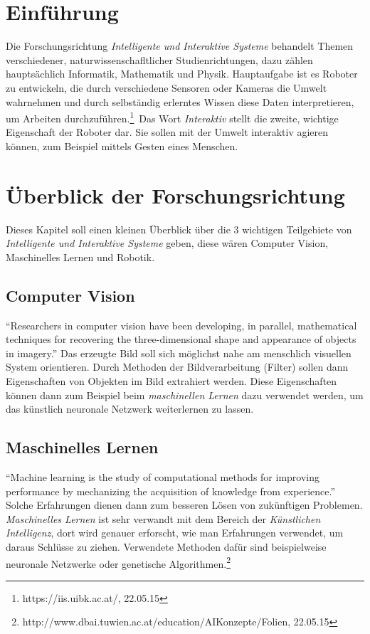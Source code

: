 \section{Einführung}
Die Forschungsrichtung \emph{Intelligente und Interaktive Systeme} behandelt Themen verschiedener, naturwissenschafltlicher Studienrichtungen, dazu zählen hauptsächlich Informatik, Mathematik und Physik. Hauptaufgabe ist es Roboter zu entwickeln, die durch verschiedene Sensoren oder Kameras die Umwelt wahrnehmen und durch selbständig erlerntes Wissen diese Daten interpretieren, um Arbeiten durchzuführen.\footnote{https://iis.uibk.ac.at/, 22.05.15}\ Das Wort \emph{Interaktiv} stellt die zweite, wichtige Eigenschaft der Roboter dar. Sie sollen mit der Umwelt interaktiv agieren können, zum Beispiel mittels Gesten eines Menschen.
\section{Überblick der Forschungsrichtung} \label{überblick}
Dieses Kapitel soll einen kleinen Überblick über die 3 wichtigen Teilgebiete von \emph{Intelligente und Interaktive Systeme} geben, diese wären Computer Vision, Maschinelles Lernen und Robotik.
	\subsection{Computer Vision} \label{vis}
	\enquote{Researchers  in  computer  vision  have  been  developing, in		parallel,  mathematical  techniques for recovering the three-dimensional shape and appearance of objects in imagery.}\cite{Szeliski:2010:CVA:1941882} Das erzeugte Bild soll sich möglichst nahe am menschlich visuellen System orientieren. Durch Methoden der Bildverarbeitung (Filter) sollen dann Eigenschaften von Objekten im Bild extrahiert werden. Diese Eigenschaften können dann zum Beispiel beim \emph{maschinellen Lernen} dazu verwendet werden, um das künstlich neuronale Netzwerk weiterlernen zu lassen.
	\subsection{Maschinelles Lernen} \label{masch}
	\enquote{Machine learning is the study of computational methods for improving performance by mechanizing the acquisition of knowledge from experience.}\cite{Langley:1995:AML:219717.219768} Solche Erfahrungen dienen dann zum besseren Lösen von zukünftigen Problemen. \emph{Maschinelles Lernen} ist sehr verwandt mit dem Bereich der \emph{Künstlichen Intelligenz}, dort wird genauer erforscht, wie man Erfahrungen verwendet, um daraus Schlüsse zu ziehen. Verwendete Methoden dafür sind beispielweise neuronale Netzwerke oder genetische Algorithmen.\footnote{http://www.dbai.tuwien.ac.at/education/AIKonzepte/Folien, 22.05.15}
